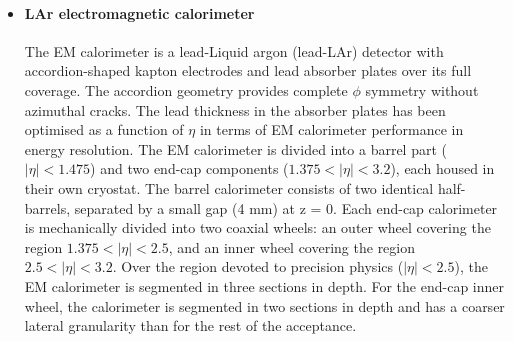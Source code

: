 \documentclass[letterpaper,12pt]{article}
\begin{document}
	\begin{itemize}
		\item \paragraph{LAr electromagnetic calorimeter} 
		The EM calorimeter is a 
		lead-Liquid argon (lead-LAr) detector with accordion-shaped kapton electrodes and lead 
		absorber plates over its full coverage. The accordion geometry provides 
		complete $\phi$ symmetry without azimuthal cracks. The lead thickness in 
		the absorber plates has been optimised as a function of $\eta$ in terms of EM calorimeter
		performance in energy resolution. 
		The EM calorimeter is divided into a barrel part ($|\eta| < 1.475$) 
		and two end-cap components ($1.375 < |\eta|< 3.2$), each housed 
		in their own cryostat.
		The barrel calorimeter
		consists of two identical half-barrels, separated by a small gap (4 mm) at z = 0. 
		Each end-cap calorimeter is mechanically divided into two coaxial wheels: 
		an outer wheel covering the region $1.375 < |\eta|< 2.5$, and an inner wheel 
		covering the region $2.5 < |\eta|< 3.2$.
		Over the region devoted to precision physics ($|\eta|< 2.5$), the
		EM calorimeter is segmented in three sections in depth. 
		For the end-cap inner wheel, the calorimeter is segmented 
		in two sections in depth and has a coarser lateral granularity than for the rest of
		the acceptance.


\end{itemize}
\end{document}
